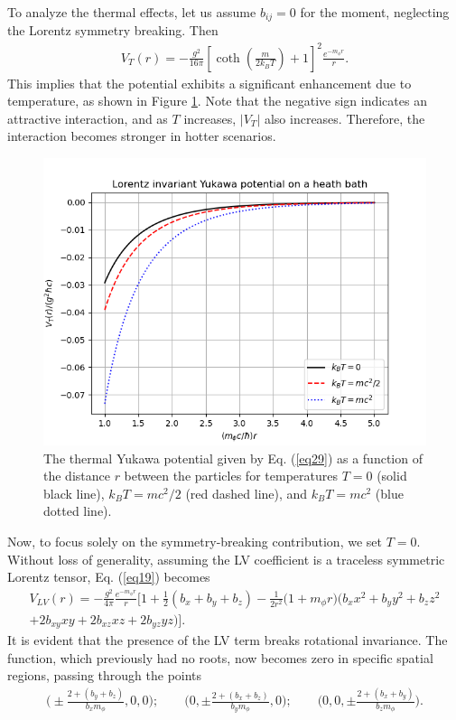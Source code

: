\documentclass[11pt,showpacs,preprintnumbers,amsmath,amssymb,prd,nofootinbib,superscriptaddress]{revtex4-2}
\begin{document}
To analyze the thermal effects, let us assume $b_{ij} = 0$ for the moment, neglecting the Lorentz symmetry breaking. Then
\begin{eqnarray}
    V_T(r)=-\frac{g^2 }{16\pi}\left[\coth{\left(\frac{m}{2k_BT}\right)}+1\right]^2\frac{e^{-m_{\phi}r}}{r}.\label{eq29}
\end{eqnarray}
This implies that the potential exhibits a significant enhancement due to temperature, as shown in Figure \ref{fig3}. Note that the negative sign indicates an attractive interaction, and as $T$ increases, $|V_T|$ also increases. Therefore, the interaction becomes stronger in hotter scenarios.
\begin{figure}[ht]
    \centering
\includegraphics[width=0.6\linewidth]{LIThermalPotential.png}
    \caption{The thermal Yukawa potential given by Eq. (\ref{eq29}) as a function of the distance $r$ between the particles for temperatures $T=0$ (solid black line), $k_B T = mc^2 / 2$ (red dashed line), and $k_B T = mc^2$ (blue dotted line).}
    \label{fig3}
\end{figure}

Now, to focus solely on the symmetry-breaking contribution, we set $T=0$. Without loss of generality, assuming the LV coefficient is a traceless symmetric Lorentz tensor, Eq. (\ref{eq19}) becomes
\begin{eqnarray}
    V_{LV}(r)=-\frac{g^2}{4\pi}\frac{e^{-m_{\phi}r}}{r}\biggl[1+\frac{1}{2}(b_{x}+b_{y}+b_{z})-\frac{1}{2r^2}\biggl(1+{m_\phi}r\biggr)\biggl(b_{x}x^2+b_{y}y^2+b_{z}z^2\nonumber\\+2b_{xy}xy+2b_{xz}xz+2b_{yz}yz\biggr)\biggr].
\end{eqnarray}
It is evident that the presence of the LV term breaks rotational invariance. The function, which previously had no roots, now becomes zero in specific spatial regions, passing through the points
\begin{eqnarray}
    \biggl(\pm \frac{2+(b_y+b_z)}{b_x m_\phi},0,0\biggr);\quad\quad \biggl(0,\pm \frac{2+(b_x+b_z)}{b_y m_\phi},0\biggr);\quad\quad \biggl(0,0,\pm \frac{2+(b_x+b_y)}{b_z m_\phi}\biggr).
\end{eqnarray}
\end{document}
